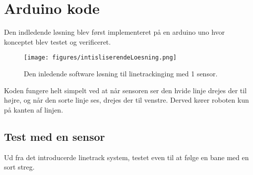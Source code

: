 \section{Arduino kode}
Den indledende løsning blev først implementeret på en arduino uno hvor konceptet blev testet og verificeret.

\begin{figure}[h!]
  \centering
  \texttt{[image: figures/intisliserendeLoesning.png]}
  \caption{Den inledende software løsning til linetrackinging med 1 sensor.}
  \label{init_software}
\end{figure}

Koden fungere helt simpelt ved at når sensoren ser den hvide linje drejes der til højre, og når den sorte linje ses, drejes der til venstre. Derved kører roboten kun på kanten af linjen.

\subsection{Test med en sensor}
Ud fra det introducerde linetrack system, testet even til at følge en bane med en sort streg.
